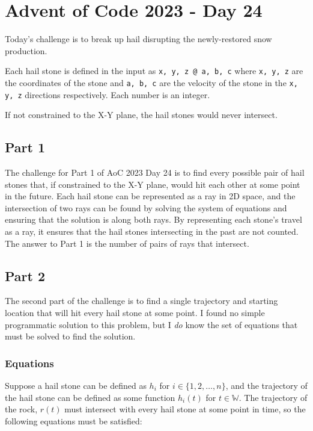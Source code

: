 \documentclass[11pt]{article}
\begin{document}
\section{Advent of Code 2023 - Day 24}
\label{sec:advent-of-code-2023---day-24}

Today's challenge is to break up hail disrupting the newly-restored snow production.

Each hail stone is defined in the input as \texttt{x, y, z @ a, b, c} where \texttt{x, y, z} are the coordinates of
the stone and \texttt{a, b, c} are the velocity of the stone in the \texttt{x, y, z} directions respectively.
Each number is an integer.

If not constrained to the X-Y plane, the hail stones would never intersect.

\subsection{Part 1}
\label{subsec:part-1}

The challenge for Part 1 of AoC 2023 Day 24 is to find every possible pair of hail stones that, if constrained to
the X-Y plane, would hit each other at some point in the future.
Each hail stone can be represented as a ray in 2D space, and the intersection of two rays can be found by solving the
system of equations and ensuring that the solution is along both rays.
By representing each stone's travel as a ray, it ensures that the hail stones intersecting in the past are not
counted.
The answer to Part 1 is the number of pairs of rays that intersect.

\subsection{Part 2}
\label{subsec:part-2}

The second part of the challenge is to find a single trajectory and starting location that will hit every hail stone
    at some point.
I found no simple programmatic solution to this problem, but I \textit{do} know the set of equations that must be solved
    to find the solution.

\subsubsection{Equations}
\label{subsubsec:equations}

Suppose a hail stone can be defined as $h_i$ for $i \in \{1, 2, \dots, n\}$, and the trajectory of the hail stone
    can be defined as some function $h_i(t)$ for $t \in \mathbb{W}$.
The trajectory of the rock, $r(t)$ must intersect with every hail stone at some point in time, so the following
    equations must be satisfied:
\end{document}
